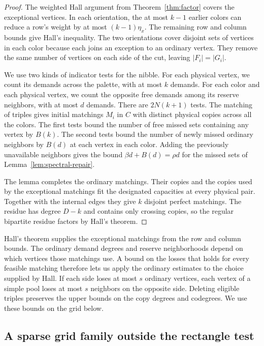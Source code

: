 \begin{proof}
The weighted Hall argument from Theorem~\ref{thm:factor} covers the exceptional vertices. In each orientation, the at most \(k-1\) earlier colors can reduce a row's weight by at most \((k-1)\eta_x\). The remaining row and column bounds give Hall's inequality. The two orientations cover disjoint sets of vertices in each color because each joins an exception to an ordinary vertex. They remove the same number of vertices on each side of the cut, leaving \(|F_i|=|G_i|\).

We use two kinds of indicator tests for the nibble. For each physical vertex, we count its demands across the palette, with at most \(k\) demands. For each color and each physical vertex, we count the opposite free demands among its reserve neighbors, with at most \(d\) demands. There are \(2N(k+1)\) tests. The matching of triples gives initial matchings \(M_i\) in \(C\) with distinct physical copies across all the colors. The first tests bound the number of free missed sets containing any vertex by \(B(k)\). The second tests bound the number of newly missed ordinary neighbors by \(B(d)\) at each vertex in each color. Adding the previously unavailable neighbors gives the bound \(\beta d+B(d)=\rho d\) for the missed sets of Lemma~\ref{lem:spectral-repair}.

The lemma completes the ordinary matchings. Their copies and the copies used by the exceptional matchings fit the designated capacities at every physical pair. Together with the internal edges they give \(k\) disjoint perfect matchings. The residue has degree \(D-k\) and contains only crossing copies, so the regular bipartite residue factors by Hall's theorem.
\end{proof}

Hall's theorem supplies the exceptional matchings from the row and column bounds. The ordinary demand degrees and reserve neighborhoods depend on which vertices those matchings use. A bound on the losses that holds for every feasible matching therefore lets us apply the ordinary estimates to the choice supplied by Hall. If each side loses at most \(s\) ordinary vertices, each vertex of a simple pool loses at most \(s\) neighbors on the opposite side. Deleting eligible triples preserves the upper bounds on the copy degrees and codegrees. We use these bounds on the grid below.

\subsection{A sparse grid family outside the rectangle test}\label{sec:sparse-reserve-example}

